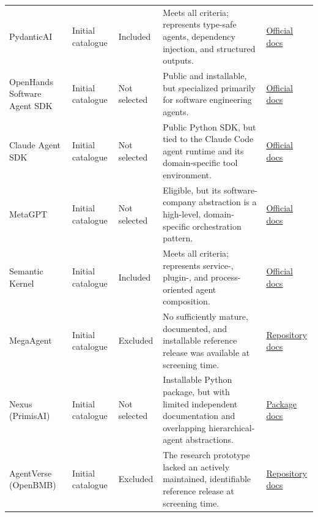 \begin{longtable}{
    @{}
    p{}
    p{}
    >{\centering\arraybackslash}p{}
    p{}
    p{}
    @{}
}
    PydanticAI
    & Initial catalogue
    & \cellcolor{green!25}Included
    & Meets all criteria; represents type-safe agents, dependency injection,
    and structured outputs.
    & \href{https://pydantic.dev/docs/ai/}{Official docs} \\

    OpenHands Software Agent SDK
    & Initial catalogue
    & Not selected
    & Public and installable, but specialized primarily for software
    engineering agents.
    & \href{https://docs.openhands.dev/sdk/}{Official docs} \\

    Claude Agent SDK
    & Initial catalogue
    & Not selected
    & Public Python SDK, but tied to the Claude Code agent runtime and its
    domain-specific tool environment.
    & \href{https://code.claude.com/docs/en/agent-sdk/overview}
    {Official docs} \\

    MetaGPT
    & Initial catalogue
    & Not selected
    & Eligible, but its software-company abstraction is a high-level,
    domain-specific orchestration pattern.
    & \href{https://docs.deepwisdom.ai/main/en/}{Official docs} \\

    Semantic Kernel
    & Initial catalogue
    & \cellcolor{green!25}Included
    & Meets all criteria; represents service-, plugin-, and process-oriented
    agent composition.
    & \href{https://learn.microsoft.com/en-us/semantic-kernel/frameworks/agent/}
    {Official docs} \\

    MegaAgent
    & Initial catalogue
    & Excluded
    & No sufficiently mature, documented, and installable reference release
    was available at screening time.
    & \href{https://github.com/Xtra-Computing/MegaAgent}{Repository docs} \\

    Nexus (PrimisAI)
    & Initial catalogue
    & Not selected
    & Installable Python package, but with limited independent documentation
    and overlapping hierarchical-agent abstractions.
    & \href{https://pypi.org/project/primisai/}{Package docs} \\

    AgentVerse (OpenBMB)
    & Initial catalogue
    & Excluded
    & The research prototype lacked an actively maintained, identifiable
    reference release at screening time.
    & \href{https://github.com/OpenBMB/AgentVerse\#readme}{Repository docs} \\


\end{longtable}
